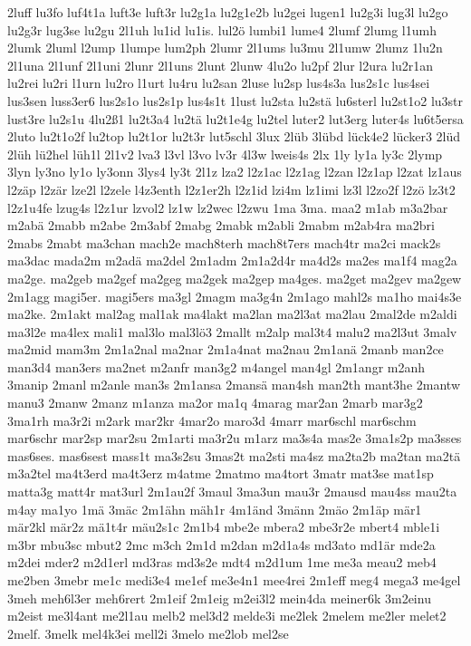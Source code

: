{2luff
lu3fo
luf4t1a
luft3e
luft3r
lu2g1a
lu2g1e2b
lu2gei
lugen1
lu2g3i
lug3l
lu2go
lu2g3r
lug3se
lu2gu
2l1uh
lu1id
lu1is.
lul2ö
lumbi1
lume4
2lumf
2lumg
l1umh
2lumk
2luml
l2ump
1lumpe
lum2ph
2lumr
2l1ums
lu3mu
2l1umw
2lumz
1lu2n
2l1una
2l1unf
2l1uni
2lunr
2l1uns
2lunt
2lunw
4lu2o
lu2pf
2lur
l2ura
lu2r1an
lu2rei
lu2ri
l1urn
lu2ro
l1urt
lu4ru
lu2san
2luse
lu2sp
lus4s3a
lus2s1c
lus4sei
lus3sen
luss3er6
lus2s1o
lus2s1p
lus4s1t
1lust
lu2sta
lu2stä
lu6sterl
lu2st1o2
lu3str
lust3re
lu2s1u
4lu2ß1
lu2t3a4
lu2tä
lu2t1e4g
lu2tel
luter2
lut3erg
luter4s
lu6t5ersa
2luto
lu2t1o2f
lu2top
lu2t1or
lu2t3r
lut5schl
3lux
2lüb
3lübd
lück4e2
lücker3
2lüd
2lüh
lü2hel
lüh1l
2l1v2
lva3
l3vl
l3vo
lv3r
4l3w
lweis4s
2lx
1ly
ly1a
ly3c
2lymp
3lyn
ly3no
ly1o
ly3onn
3lys4
ly3t
2l1z
lza2
l2z1ac
l2z1ag
l2zan
l2z1ap
l2zat
lz1aus
l2zäp
l2zär
lze2l
l2zele
l4z3enth
l2z1er2h
l2z1id
lzi4m
lz1imi
lz3l
l2zo2f
l2zö
lz3t2
l2z1u4fe
lzug4s
l2z1ur
lzvol2
lz1w
lz2wec
l2zwu
1ma
3ma.
maa2
m1ab
m3a2bar
m2abä
2mabb
m2abe
2m3abf
2mabg
2mabk
m2abli
2mabm
m2ab4ra
ma2bri
2mabs
2mabt
ma3chan
mach2e
mach8terh
mach8t7ers
mach4tr
ma2ci
mack2s
ma3dac
mada2m
m2adä
ma2del
2m1adm
2m1a2d4r
ma4d2s
ma2es
ma1f4
mag2a
ma2ge.
ma2geb
ma2gef
ma2geg
ma2gek
ma2gep
ma4ges.
ma2get
ma2gev
ma2gew
2m1agg
magi5er.
magi5ers
ma3gl
2magm
ma3g4n
2m1ago
mahl2s
ma1ho
mai4s3e
ma2ke.
2m1akt
mal2ag
mal1ak
ma4lakt
ma2lan
ma2l3at
ma2lau
2mal2de
m2aldi
ma3l2e
ma4lex
mali1
mal3lo
mal3lö3
2mallt
m2alp
mal3t4
malu2
ma2l3ut
3malv
ma2mid
mam3m
2m1a2nal
ma2nar
2m1a4nat
ma2nau
2m1anä
2manb
man2ce
man3d4
man3ers
ma2net
m2anfr
man3g2
m4angel
man4gl
2m1angr
m2anh
3manip
2manl
m2anle
man3s
2m1ansa
2mansä
man4sh
man2th
mant3he
2mantw
manu3
2manw
2manz
m1anza
ma2or
ma1q
4marag
mar2an
2marb
mar3g2
3ma1rh
ma3r2i
m2ark
mar2kr
4mar2o
maro3d
4marr
mar6schl
mar6schm
mar6schr
mar2sp
mar2su
2m1arti
ma3r2u
m1arz
ma3s4a
mas2e
3ma1s2p
ma3sses
mas6ses.
mas6sest
mass1t
ma3s2su
3mas2t
ma2sti
ma4sz
ma2ta2b
ma2tan
ma2tä
m3a2tel
ma4t3erd
ma4t3erz
m4atme
2matmo
ma4tort
3matr
mat3se
mat1sp
matta3g
matt4r
mat3url
2m1au2f
3maul
3ma3un
mau3r
2mausd
mau4ss
mau2ta
m4ay
ma1yo
1mä
3mäc
2m1ähn
mäh1r
4m1änd
3männ
2mäo
2m1äp
mär1
mär2kl
mär2z
mä1t4r
mäu2s1c
2m1b4
mbe2e
mbera2
mbe3r2e
mbert4
mble1i
m3br
mbu3sc
mbut2
2mc
m3ch
2m1d
m2dan
m2d1a4s
md3ato
md1är
mde2a
m2dei
mder2
m2d1erl
md3ras
md3s2e
mdt4
m2d1um
1me
me3a
meau2
meb4
me2ben
3mebr
me1c
medi3e4
me1ef
me3e4n1
mee4rei
2m1eff
meg4
mega3
me4gel
3meh
meh6l3er
meh6rert
2m1eif
2m1eig
m2ei3l2
mein4da
meiner6k
3m2einu
m2eist
me3l4ant
me2l1au
melb2
mel3d2
melde3i
me2lek
2melem
me2ler
melet2
2melf.
3melk
mel4k3ei
mell2i
3melo
me2lob
mel2se
}
